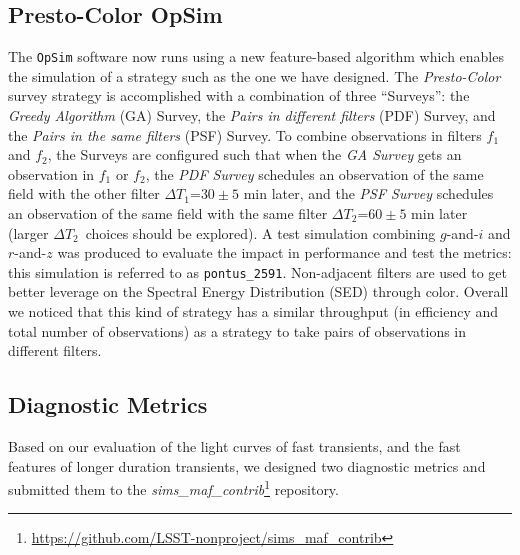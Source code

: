 \documentclass[letterpaper,longauthor,trackchanges,twocolumn,onecolappendix,sort&compress]{aastex62}
\newcommand{\dtone}{\ensuremath{\Delta T_1}}
\newcommand{\dttwo}{\ensuremath{\Delta T_2}}
\begin{document}
\subsection{Presto-Color OpSim}

The {\tt OpSim} software now runs using a new feature-based algorithm which enables the simulation of a strategy such as the one we have designed. The {\em Presto-Color} survey strategy is accomplished with a combination of three ``Surveys'': the {\it Greedy Algorithm} (GA) Survey, the {\it Pairs in different filters} (PDF) Survey, and the {\it Pairs in the same filters} (PSF) Survey. To combine observations in filters $f_1$ and $f_2$, the Surveys are configured such that when the {\it GA Survey} gets an observation in $f_1$ or $f_2$, the {\it PDF Survey} schedules an observation of the same field with the other filter \dtone=$30 \pm 5$ min later, and the {\it PSF Survey} schedules an observation of the same field with the same filter \dttwo=$60 \pm 5$ min later (larger \dttwo\ choices should be explored). A test simulation combining $g$-and-$i$ and $r$-and-$z$ was produced to evaluate the impact in performance and test the metrics: this simulation is referred to as {\tt pontus\_2591}. Non-adjacent filters are used to get better leverage on the Spectral Energy Distribution (SED) through color. Overall we noticed that this kind of strategy has a similar throughput (in efficiency and total number of observations) as a strategy to take pairs of observations in different filters. 


\subsection{Diagnostic Metrics}

Based on our evaluation of the light curves of fast transients, and the fast features of longer duration transients, we designed two diagnostic metrics and submitted them to the {\em sims\_maf\_contrib}\footnote{\url{https://github.com/LSST-nonproject/sims\_maf\_contrib}} repository.
\end{document}
